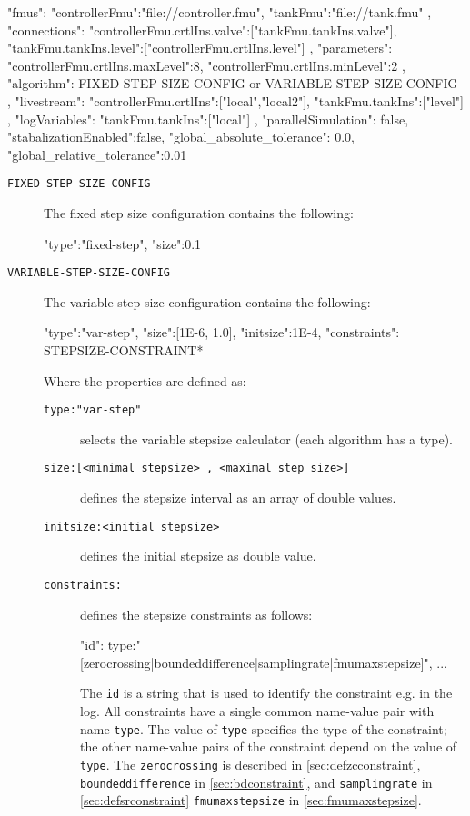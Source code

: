 %
%
%
\begin{json}
	{
		"fmus":{
			"{controllerFmu}":"file://controller.fmu",
			"{tankFmu}":"file://tank.fmu"
		},
		"connections":{
			"{controllerFmu}.crtlIns.valve":["{tankFmu}.tankIns.valve"],
			"{tankFmu}.tankIns.level":["{controllerFmu}.crtlIns.level"]
		},
		"parameters":{
			"{controllerFmu}.crtlIns.maxLevel":8,
			"{controllerFmu}.crtlIns.minLevel":2
		},
		"algorithm":{
			FIXED-STEP-SIZE-CONFIG or VARIABLE-STEP-SIZE-CONFIG
		},
		"livestream":{
			"{controllerFmu}.crtlIns":["local","local2"],
			"{tankFmu}.tankIns":["level"]
		},
		"logVariables":{
			"{tankFmu}.tankIns":["local"]
		},
		"parallelSimulation": false,
		"stabalizationEnabled":false,
		"global_absolute_tolerance": 0.0,
		"global_relative_tolerance":0.01
			
	}
\end{json}
%
%
%
\begin{description}
	\item[\texttt{FIXED-STEP-SIZE-CONFIG} ] The fixed step size configuration contains the following:
	\begin{json}
		"type":"fixed-step",
		"size":0.1
	\end{json}
	\item[\texttt{VARIABLE-STEP-SIZE-CONFIG} ] The variable step size configuration contains the following:
	\begin{json}
		"type":"var-step",
		"size":[1E-6, 1.0],
		"initsize":1E-4,
		"constraints":{
			STEPSIZE-CONSTRAINT*
		}
	\end{json} 
	Where the properties are defined as:
	\begin{description}
		\item [\texttt{type:"var-step"}] selects the variable stepsize calculator (each algorithm has a {\ttfamily type}).
		\item [\texttt{size:[<minimal stepsize> , <maximal step size>]}] de\-fi\-nes the stepsize interval as an array of double values.
		\item [\texttt{initsize:<initial stepsize>}] defines the initial stepsize as double value.
		\item [\texttt{constraints:}] defines the stepsize constraints as follows:
		
		\begin{json}
			"id":{
				type:"[zerocrossing|boundeddifference|samplingrate|fmumaxstepsize]",
				...
			}
		\end{json}
		
		The \texttt{id} is a string that is used to identify the constraint e.g. in the log. All constraints have a single common name-value pair with name \texttt{type}. The value of \texttt{type} specifies the type of the constraint; the other name-value pairs of the constraint depend on the value of \texttt{type}. The \texttt{zerocrossing} is described in \autoref{sec:defzcconstraint}, \texttt{boundeddifference} in \autoref{sec:bdconstraint}, and \texttt{samplingrate} in \autoref{sec:defsrconstraint} \texttt{fmumaxstepsize} in \autoref{sec:fmumaxstepsize}.
	\end{description}
\end{description}


